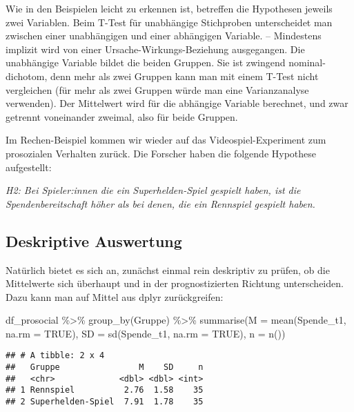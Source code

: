 \documentclass[
]{book}
\newenvironment{Shaded}{\begin{snugshade}}{\end{snugshade}}
\newcommand{\AttributeTok}[1]{\textcolor[rgb]{0.77,0.63,0.00}{#1}}
\newcommand{\ConstantTok}[1]{\textcolor[rgb]{0.00,0.00,0.00}{#1}}
\newcommand{\FunctionTok}[1]{\textcolor[rgb]{0.00,0.00,0.00}{#1}}
\newcommand{\NormalTok}[1]{#1}
\newcommand{\SpecialCharTok}[1]{\textcolor[rgb]{0.00,0.00,0.00}{#1}}
\begin{document}
Wie in den Beispielen leicht zu erkennen ist, betreffen die Hypothesen jeweils zwei Variablen. Beim T-Test für unabhängige Stichproben unterscheidet man zwischen einer unabhängigen und einer abhängigen Variable. -- Mindestens implizit wird von einer Ursache-Wirkungs-Beziehung ausgegangen. Die unabhängige Variable bildet die beiden Gruppen. Sie ist zwingend nominal-dichotom, denn mehr als zwei Gruppen kann man mit einem T-Test nicht vergleichen (für mehr als zwei Gruppen würde man eine Varianzanalyse verwenden). Der Mittelwert wird für die abhängige Variable berechnet, und zwar getrennt voneinander zweimal, also für beide Gruppen.

Im Rechen-Beispiel kommen wir wieder auf das Videospiel-Experiment zum prosozialen Verhalten zurück. Die Forscher haben die folgende Hypothese aufgestellt:

\emph{H2: Bei Spieler:innen die ein Superhelden-Spiel gespielt haben, ist die Spendenbereitschaft höher als bei denen, die ein Rennspiel gespielt haben.}

\hypertarget{deskriptive-auswertung}{%
\subsection{Deskriptive Auswertung}\label{deskriptive-auswertung}}

Natürlich bietet es sich an, zunächst einmal rein deskriptiv zu prüfen, ob die Mittelwerte sich überhaupt und in der prognostizierten Richtung unterscheiden. Dazu kann man auf Mittel aus dplyr zurückgreifen:

\begin{Shaded}
\begin{Highlighting}[]
\NormalTok{df\_prosocial }\SpecialCharTok{\%\textgreater{}\%} 
  \FunctionTok{group\_by}\NormalTok{(Gruppe) }\SpecialCharTok{\%\textgreater{}\%} 
  \FunctionTok{summarise}\NormalTok{(}\AttributeTok{M =} \FunctionTok{mean}\NormalTok{(Spende\_t1, }\AttributeTok{na.rm =} \ConstantTok{TRUE}\NormalTok{), }
            \AttributeTok{SD =} \FunctionTok{sd}\NormalTok{(Spende\_t1, }\AttributeTok{na.rm =} \ConstantTok{TRUE}\NormalTok{), }
            \AttributeTok{n =} \FunctionTok{n}\NormalTok{())}
\end{Highlighting}
\end{Shaded}

\begin{verbatim}
## # A tibble: 2 x 4
##   Gruppe                M    SD     n
##   <chr>             <dbl> <dbl> <int>
## 1 Rennspiel          2.76  1.58    35
## 2 Superhelden-Spiel  7.91  1.78    35
\end{verbatim}
\end{document}
